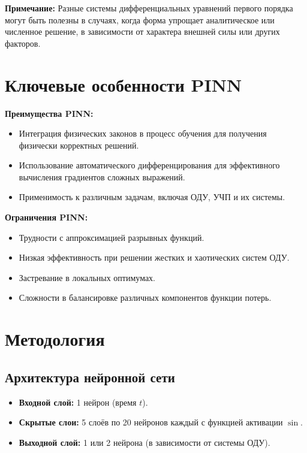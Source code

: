\documentclass[12pt,a4paper]{article}
\begin{document}
\textbf{Примечание:}
Разные системы дифференциальных уравнений первого порядка могут быть полезны в случаях, когда форма упрощает аналитическое или численное решение, в зависимости от характера внешней силы или других факторов.

\section{Ключевые особенности PINN}

\begin{minipage}[t]{0.45\textwidth}
    \small
    \textbf{Преимущества PINN:}
    \begin{itemize}
        \item Интеграция физических законов в процесс обучения для получения физически корректных решений.
        \item Использование автоматического дифференцирования для эффективного вычисления градиентов сложных выражений.
        \item Применимость к различным задачам, включая ОДУ, УЧП и их системы.
    \end{itemize}
\end{minipage}
\hfill
\vrule width 0.5pt
\hfill
\begin{minipage}[t]{0.45\textwidth}
    \small
    \textbf{Ограничения PINN:}
    \begin{itemize}
        \item Трудности с аппроксимацией разрывных функций.
        \item Низкая эффективность при решении жестких и хаотических систем ОДУ.
        \item Застревание в локальных оптимумах.
        \item Сложности в балансировке различных компонентов функции потерь.
    \end{itemize}
\end{minipage}

\section{Методология}

\subsection{Архитектура нейронной сети}
\begin{itemize}
    \item \textbf{Входной слой:} 1 нейрон (время $t$).
    \item \textbf{Скрытые слои:} 5 слоёв по 20 нейронов каждый с функцией активации $\sin$.
    \item \textbf{Выходной слой:} 1 или 2 нейрона (в зависимости от системы ОДУ).
\end{itemize}
\end{document}
